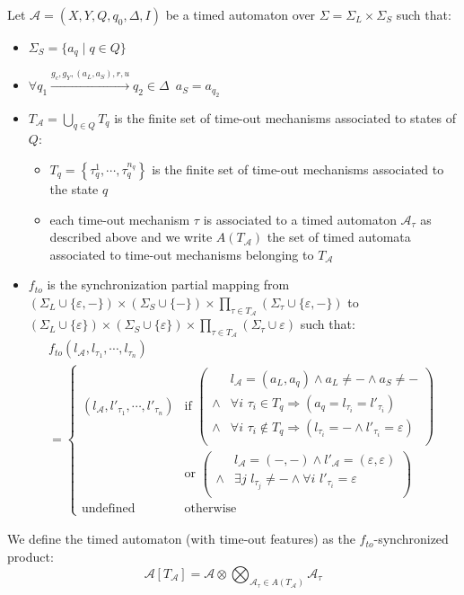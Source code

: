 \documentclass[a4paper,10pt]{article}
\def\A{\ensuremath{\mathcal{A}}}
\def\TIO{{\mbox{\sf to}}}
\begin{document}
Let 
$\A = (X,Y,Q,q_0,\Delta,I)$ be a timed automaton over $\Sigma =
\Sigma_L \times \Sigma_S$ such that:
\begin{itemize}
\item $\Sigma_S = \{ a_q \mid q \in Q \}$
\item $\forall q_1 \xrightarrow{g_c,g_Y,(a_L,a_S),r,u} q_2 \in \Delta
  \, \, \,  a_S = a_{q_2}$
\item $T_\A = \bigcup_{q \in Q} T_q$ is the finite set of time-out
  mechanisms associated to states of $Q$:
\begin{itemize}
\item $T_q = \left \{ 
\tau_q^1 , \cdots , \tau_q^{n_q}
\right \}$ is the finite set of
  time-out mechanisms associated to the state $q$
\item each time-out mechanism $\tau$ is associated to a timed
  automaton $\A_\tau$ as described above and we write $A(T_\A)$ the
  set of timed automata associated to time-out mechanisms belonging
  to $T_\A$
\end{itemize}
\item $f_{to}$ is the synchronization partial mapping from
$(\Sigma_L \cup \{ \varepsilon , - \}) \times (\Sigma_S  \cup \{
 - \}) \times \prod_{\tau \in T_\A} (\Sigma_\tau  \cup
\{ \varepsilon, - \})$ to $(\Sigma_L \cup \{ \varepsilon \}) \times (\Sigma_S \cup \{ \varepsilon \}) \times \prod_{\tau \in T_\A}
(\Sigma_\tau \cup \varepsilon)$ such that:
\[
\begin{array}{l}
f_{to}(l_\A,l_{\tau_1},\cdots , l_{\tau_n}) \\
=
\left \{
\begin{array}{ll}
(l_\A,l'_{\tau_1},\cdots , l'_{\tau_n}) &
\mbox{if} \, \, \left (
\begin{array}{ll} 
&  l_\A = (a_L,a_q) \land a_L \neq - \land a_S \neq - \\
\land & \forall i \, \, \tau_i \in T_q \Rightarrow
(a_q=l_{\tau_i}=l'_{\tau_i}) \\
\land & \forall i \, \, \tau_i \not \in T_q \Rightarrow
(l_{\tau_i}= - \land l'_{\tau_i} = \varepsilon) \\
\end{array} \right )
\\ 
& \mbox{or} 
\, \, \left (
\begin{array}{ll} 
&  l_\A = (-,-) \land l'_\A = (\varepsilon , \varepsilon) \\
\land & \exists j \, \, l_{\tau_j} \neq - \land \forall i \, \,
l'_{\tau_i} = \varepsilon \\
\end{array} \right )
\\
\mbox{undefined} & \mbox{otherwise}
\end{array}
\right .
\end{array}
\]
\end{itemize}
We define the timed automaton (with time-out features) as the
$f_{to}$-synchronized product:
\[
\A[T_\A] = \A \otimes \bigotimes_{\A_\tau \in A(T_\A)} \A_\tau
\]
\end{document}
